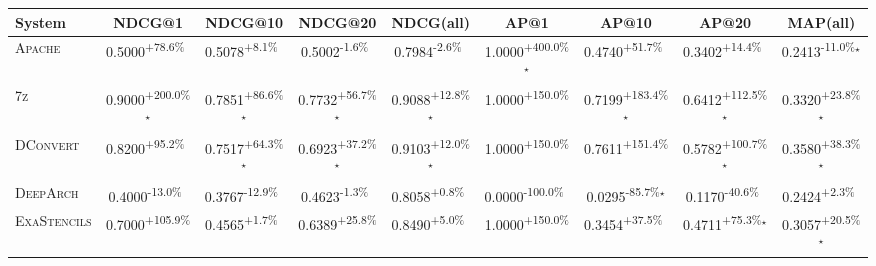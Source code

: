\begin{table}[htbp]
\centering
\renewcommand{\arraystretch}{1.2}
\begin{tabular}{l|cccc|cccc}
\hline
System & NDCG@1 & NDCG@10 & NDCG@20 & NDCG(all) & AP@1 & AP@10 & AP@20 & MAP(all) \\ \hline
\textsc{Apache} & \cellcolor{green!30}0.5000\textsuperscript{+78.6\%}$^{\,\,\,}$ & \cellcolor{green!30}0.5078\textsuperscript{+8.1\%}$^{\,\,\,}$ & \cellcolor{red!30}0.5002\textsuperscript{-1.6\%}$^{\,\,\,}$ & \cellcolor{red!30}0.7984\textsuperscript{-2.6\%}$^{\,\,\,}$ & \cellcolor{green!30}1.0000\textsuperscript{+400.0\%}$^\star$ & \cellcolor{green!30}0.4740\textsuperscript{+51.7\%}$^{\,\,\,}$ & \cellcolor{green!30}0.3402\textsuperscript{+14.4\%}$^{\,\,\,}$ & \cellcolor{red!30}0.2413\textsuperscript{-11.0\%}$^\star$ \\
\textsc{7z} & \cellcolor{green!30}0.9000\textsuperscript{+200.0\%}$^\star$ & \cellcolor{green!30}0.7851\textsuperscript{+86.6\%}$^\star$ & \cellcolor{green!30}0.7732\textsuperscript{+56.7\%}$^\star$ & \cellcolor{green!30}0.9088\textsuperscript{+12.8\%}$^\star$ & \cellcolor{green!30}1.0000\textsuperscript{+150.0\%}$^{\,\,\,}$ & \cellcolor{green!30}0.7199\textsuperscript{+183.4\%}$^\star$ & \cellcolor{green!30}0.6412\textsuperscript{+112.5\%}$^\star$ & \cellcolor{green!30}0.3320\textsuperscript{+23.8\%}$^\star$ \\
\textsc{DConvert} & \cellcolor{green!30}0.8200\textsuperscript{+95.2\%}$^{\,\,\,}$ & \cellcolor{green!30}0.7517\textsuperscript{+64.3\%}$^\star$ & \cellcolor{green!30}0.6923\textsuperscript{+37.2\%}$^\star$ & \cellcolor{green!30}0.9103\textsuperscript{+12.0\%}$^\star$ & \cellcolor{green!30}1.0000\textsuperscript{+150.0\%}$^{\,\,\,}$ & \cellcolor{green!30}0.7611\textsuperscript{+151.4\%}$^{\,\,\,}$ & \cellcolor{green!30}0.5782\textsuperscript{+100.7\%}$^\star$ & \cellcolor{green!30}0.3580\textsuperscript{+38.3\%}$^\star$ \\
\textsc{DeepArch} & \cellcolor{red!30}0.4000\textsuperscript{-13.0\%}$^{\,\,\,}$ & \cellcolor{red!30}0.3767\textsuperscript{-12.9\%}$^{\,\,\,}$ & \cellcolor{red!30}0.4623\textsuperscript{-1.3\%}$^{\,\,\,}$ & \cellcolor{green!30}0.8058\textsuperscript{+0.8\%}$^{\,\,\,}$ & \cellcolor{red!30}0.0000\textsuperscript{-100.0\%}$^{\,\,\,}$ & \cellcolor{red!30}0.0295\textsuperscript{-85.7\%}$^\star$ & \cellcolor{red!30}0.1170\textsuperscript{-40.6\%}$^{\,\,\,}$ & \cellcolor{green!30}0.2424\textsuperscript{+2.3\%}$^{\,\,\,}$ \\
\textsc{ExaStencils} & \cellcolor{green!30}0.7000\textsuperscript{+105.9\%}$^{\,\,\,}$ & \cellcolor{green!30}0.4565\textsuperscript{+1.7\%}$^{\,\,\,}$ & \cellcolor{green!30}0.6389\textsuperscript{+25.8\%}$^{\,\,\,}$ & \cellcolor{green!30}0.8490\textsuperscript{+5.0\%}$^{\,\,\,}$ & \cellcolor{green!30}1.0000\textsuperscript{+150.0\%}$^{\,\,\,}$ & \cellcolor{green!30}0.3454\textsuperscript{+37.5\%}$^{\,\,\,}$ & \cellcolor{green!30}0.4711\textsuperscript{+75.3\%}$^\star$ & \cellcolor{green!30}0.3057\textsuperscript{+20.5\%}$^\star$ \\

\end{tabular}
\end{table}

